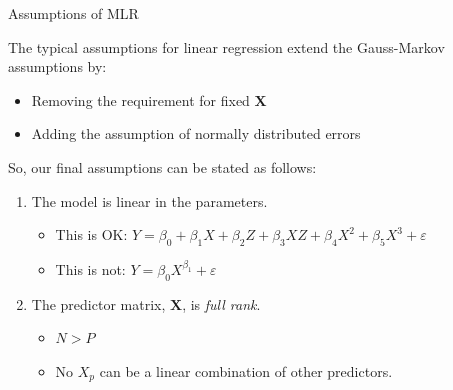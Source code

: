 \documentclass{beamer}\usepackage[]{graphicx}\usepackage[]{color}
\begin{document}

\begin{frame}[allowframebreaks]{Assumptions of MLR}

  The typical assumptions for linear regression extend the Gauss-Markov 
  assumptions by:
  \begin{itemize}
  \item Removing the requirement for fixed $\mathbf{X}$
  \item Adding the assumption of normally distributed errors
  \end{itemize}
  \vb
  So, our final assumptions can be stated as follows:
  \vb
  \begin{enumerate}
  \item The model is linear in the parameters.
    \vc
    \begin{itemize}
    \item This is OK: $Y = \beta_0 + \beta_1X + \beta_2Z + \beta_3XZ + \beta_4X^2 + \beta_5X^3 + \varepsilon$
      \vc
    \item This is not: $Y = \beta_0 X^{\beta_1} + \varepsilon$
    \end{itemize}
    \vb
  \item The predictor matrix, $\mathbf{X}$, is \emph{full rank}.  
    \vc
    \begin{itemize}
    \item $N > P$
      \vc
    \item No $X_p$ can be a linear combination of other predictors.
    \end{itemize}
    
    \pagebreak
    

\end{enumerate}
\end{frame}
\end{document}
